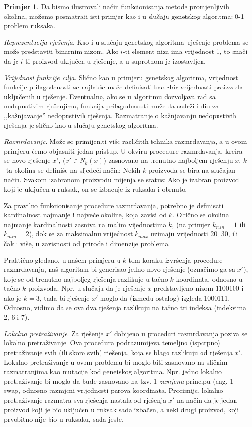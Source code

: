 \documentclass[b5paper, utf8, 11pt, colorlinks]{book}
\theoremstyle{definition}
\newtheorem{primjer}{Primjer}[chapter]
\begin{document}
 \begin{primjer} Da bismo ilustrovali način funkcionisanja metode promjenljivih okolina, možemo posmatrati isti primjer kao i u slučaju genetskog algoritma: 0-1 problem ruksaka. 
 \end{primjer}

 \emph{Reprezentacija rješenja}. Kao i u slučaju genetskog algoritma, rješenje problema se može predstaviti binarnim nizom. Ako $i$-ti element niza ima vrijednost 1, to znači da je $i$-ti proizvod uključen u rješenje, a u suprotnom je izostavljen.

 \emph{Vrijednost funkcije cilja}. Slično kao u primjeru genetskog algoritma, vrijednost funkcije prilagođenosti se najlakše može definisati kao zbir vrijednosti proizvoda uključenih u rješenje. Eventualno, ako se u algoritmu dozvoljava rad sa nedopustivim rješenjima, funkcija prilagođenosti može da sadrži i dio za ,,kažnjavanje'' nedopustivih rješenja. Razmatranje o kažnjavanju nedopustivih rješenja je slično kao u slučaju genetskog algoritma.

 \emph{Razmrdavanje}. Može se primijeniti više različitih tehnika razmrdavanja, a u ovom primjeru ćemo objasniti jedan pristup. 
 U okviru procedure razmrdavanja, kreira se novo rješenje $x'$, ($x' \in N_k(x)$) zasno\-vano na trenutno najboljem rješenju  $x$.
 $k$-ta okolina se definiše na sljedeći način: Nekih $k$ proizvoda se bira na slučajan način. Svakom izabranom proizvodu mijenja se status: Ako je izabran proizvod koji je uključen u ruksak, on se izbacuje iz ruksaka i obrnuto. 

 Za pravilno funkcionisanje procedure razmrdavanja, potrebno je definisati kardinalnost najmanje i najveće okoline, koja zavisi od $k$. Obično se okolina najmanje kardinalnosti zasniva na malim vijednostima $k$, (na primjer $k_{min}=1$ ili $k_{min}=2$), dok se za maksimalnu vrijednost $k_{max}$  uzimaju vrijednosti 20, 30, ili čak i više, u zavisnosti od prirode i dimenzije problema.

  Praktično gledano, u našem primjeru u $k$-tom koraku izvršenja procedure razmrdavanja, naš algoritam bi generisao jedno novo rješenje (označimo ga sa $x'$), koje se od trenutno najboljeg rješenja razlikuje u tačno $k$ koordinata, odnosno u tačno $k$ proizvoda. Npr. u slučaju da je rješenje $x$ predstavljeno nizom 1100100 i ako je $k=3$, tada bi rješenje    $x'$ moglo da  (između ostalog) izgleda
 1000111. Odnosno, vidimo da se ova dva rješenja razlikuju na tačno tri indeksa (indeksima 2, 6 i 7).

 \emph{Lokalno pretraživanje}. 
 Za rješenje  $x'$ dobijeno u  proceduri razmrdavanja poziva se lokalno pretraživanje. Ova procedura podrazumijeva temeljno (ispcrpno) pretraživanje svih (ili skoro svih) rješenja, koja se blago razlikuju od rješenja  $x'$. Lokalno pretraživanje u ovom problemu bi moglo biti zasnovano na sličnim razmatranjima kao mutacije kod genetskog algoritma. Npr. jedno lokalno pretraživanje bi moglo da bude zasnovano na tzv. 1-\emph{zamjena} principu (eng. 1-swap, odnosno razmjeni vrijednosti parova koordinata. Preciznije, lokalno pretraživanje razmatra sva rješenja nastala od rješenja $x'$ na način da je jedan proizvod koji je bio uključen u ruksak sada izbačen, a neki drugi proizvod, koji prvobitno nije bio u ruksaku, sada jeste.
\end{document}

